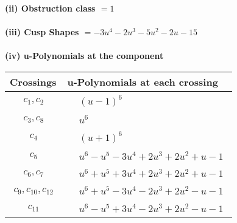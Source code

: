 \documentclass[1p]{elsarticle_modified}
\theoremstyle{definition}
\begin{document}
\flushleft \textbf{(ii) Obstruction class $= 1$}\\~\\
\flushleft \textbf{(iii) Cusp Shapes $= -3 u^4-2 u^3-5 u^2-2 u-15$}\\~\\
\newpage\renewcommand{\arraystretch}{1}
\flushleft \textbf{(iv) u-Polynomials at the component}\newline \\
\begin{tabular}{m{50pt}|m{274pt}}
Crossings & \hspace{64pt}u-Polynomials at each crossing \\
\hline $$\begin{aligned}c_{1},c_{2}\end{aligned}$$&$\begin{aligned}
&(u-1)^6
\end{aligned}$\\
\hline $$\begin{aligned}c_{3},c_{8}\end{aligned}$$&$\begin{aligned}
&u^6
\end{aligned}$\\
\hline $$\begin{aligned}c_{4}\end{aligned}$$&$\begin{aligned}
&(u+1)^6
\end{aligned}$\\
\hline $$\begin{aligned}c_{5}\end{aligned}$$&$\begin{aligned}
&u^6- u^5-3 u^4+2 u^3+2 u^2+u-1
\end{aligned}$\\
\hline $$\begin{aligned}c_{6},c_{7}\end{aligned}$$&$\begin{aligned}
&u^6+u^5+3 u^4+2 u^3+2 u^2+u-1
\end{aligned}$\\
\hline $$\begin{aligned}c_{9},c_{10},c_{12}\end{aligned}$$&$\begin{aligned}
&u^6+u^5-3 u^4-2 u^3+2 u^2- u-1
\end{aligned}$\\
\hline $$\begin{aligned}c_{11}\end{aligned}$$&$\begin{aligned}
&u^6- u^5+3 u^4-2 u^3+2 u^2- u-1
\end{aligned}$\\
\hline
\end{tabular}\\~\\
\end{document}
